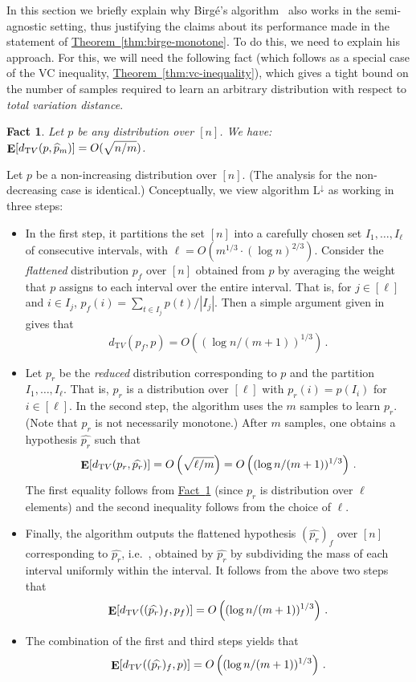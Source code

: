 \documentclass[10pt]{article}
\newtheorem{fact}[theorem]{Fact}
\theoremstyle{definition}
\providecommand{\ie}{i.e.\ }
\numberwithin{equation}{section}
\newcommand{\expref}[2]{\texorpdfstring{\hyperref[#2]{#1~\ref{#2}}}{#1~\ref{#2}}}
\DeclareMathOperator*{\E}{{\bf E}}
\newcommand{\dtv}{d_{\mathrm TV}}
\newcommand{\wh}[1]{{\widehat{#1}}}
\newcommand{\ANI}{{\mathrm{L^{\downarrow}}}}
\begin{document}
In this section we briefly explain why Birg{\'e}'s algorithm~\cite{Birge:87b}
also works in the semi-agnostic setting,
{thus justifying the claims about its performance made in the
statement of \expref{Theorem}{thm:birge-monotone}.}
To do this, we need to explain
his approach. For this, we will need the following {fact (which follows as a special case of the VC inequality, {\expref{Theorem}{thm:vc-inequality}}}), 
which gives
a tight bound on the number of samples required to
learn an arbitrary distribution with respect to \emph{total variation distance}.

\begin{fact} \label{thm:folklore}
Let $p$ be any distribution over $[n]$. We have: $\E [ \dtv ( p, \wh{p}_m) ]  =  O( \sqrt{n/m})$.
\end{fact}


Let $p$ be a non-increasing distribution over $[n]$.
(The analysis for the non-decreasing case is identical.)
Conceptually, we view algorithm $\ANI$ as working in three steps:

\begin{itemize}
\item  In the first step, it partitions the set $[n]$ into a carefully chosen
set $I_1, \ldots, I_{\ell}$ of consecutive intervals, with $\ell = O(m^{1/3} \cdot (\log n)^{2/3})$.
Consider the \emph{flattened} distribution $p_f$ over $[n]$ obtained from $p$ by averaging the weight
that $p$ assigns to each interval over the entire interval. That is, for $j \in [\ell]$ and
$i \in I_j$, $p_f(i) = \sum_{t \in I_j} p(t) / |I_j|$.
Then a simple argument given in~\cite{Birge:87b} gives
that 
\[
\dtv(p_f, p) = O\left( ({\log n / (m+1)})^{1/3} \right)\,.
\]


\item Let $p_r$ be the \emph{reduced} distribution corresponding to $p$ and the partition $I_1, \ldots, I_{\ell}$.
That is, $p_r$ is a distribution over $[\ell]$ with $p_r(i) = p(I_i)$ for $i \in [\ell]$. In the second step, the algorithm uses the $m$ samples to learn $p_r$. (Note that $p_r$ is not necessarily monotone.)
After $m$ samples, one obtains a hypothesis $\widehat{p_r}$ such that
\[
\E [\dtv(p_r, \widehat{p_r})] =  O\left( \sqrt{\ell / m} \right) =
O\left( ({\log n / (m+1)})^{1/3} \right)\,.
\]
The first equality follows from \expref{Fact}{thm:folklore} (since $p_r$ is distribution over $\ell$ elements) and
the second inequality follows from the choice of $\ell$.

\item Finally, the algorithm outputs the flattened hypothesis $(\widehat{p_r})_f$ over $[n]$
corresponding to  $\widehat{p_r}$, \ie, obtained by $\widehat{p_r}$ by subdividing
the mass of each interval uniformly within the interval. It follows from the above two steps that
\[
\E[\dtv ( (\widehat{p_r})_f, p_f)] =O\left( ({\log n / (m+1)})^{1/3}
\right)\,.
\]

\item The combination of the first and third steps yields that
\[
\E[\dtv ( (\widehat{p_r})_f, p)] =O\left( ({\log n / (m+1)})^{1/3}
\right)\,.
\]


\end{itemize}
\end{document}
